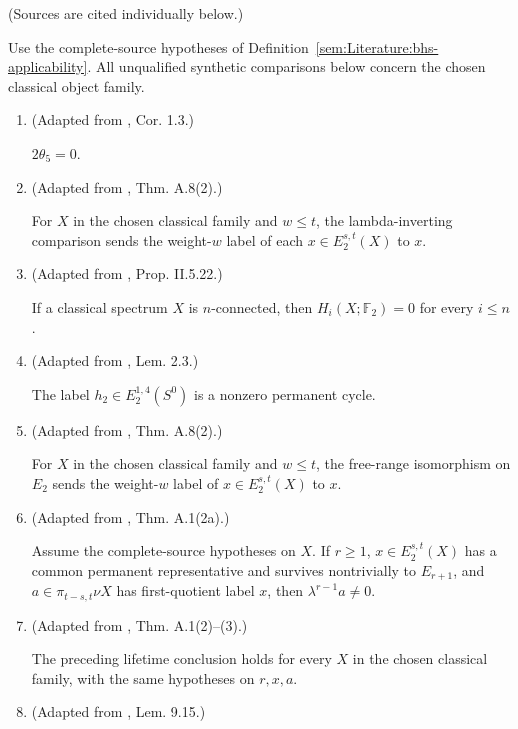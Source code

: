 \begin{theorem}
\label{frontier:Literature:d19d6b7e62ef}
(Sources are cited individually below.)\par{}

Use the complete-source hypotheses of Definition~\ref{sem:Literature:bhs-applicability}. All unqualified synthetic comparisons below concern the chosen classical object family.
\begin{enumerate}
\item (Adapted from \cite{Xu}, Cor. 1.3.)\par{}

$2\theta_5=0$.
\item (Adapted from \cite{BHS}, Thm. A.8(2).)\par{}

For $X$ in the chosen classical family and $w\le t$, the lambda-inverting comparison sends the weight-$w$ label of each $x\in E_2^{s,t}(X)$ to $x$.
\item (Adapted from \cite{SchwedeSymmetricSpectra}, Prop. II.5.22.)\par{}

If a classical spectrum $X$ is $n$-connected, then $H_i(X;\mathbb F_2)=0$ for every $i\le n$.
\item (Adapted from \cite{Adams58}, Lem. 2.3.)\par{}

The label $h_2\in E_2^{1,4}(S^0)$ is a nonzero permanent cycle.
\item (Adapted from \cite{BHS}, Thm. A.8(2).)\par{}

For $X$ in the chosen classical family and $w\le t$, the free-range isomorphism on $E_2$ sends the weight-$w$ label of $x\in E_2^{s,t}(X)$ to $x$.
\item (Adapted from \cite{BHS}, Thm. A.1(2a).)\par{}

Assume the complete-source hypotheses on $X$. If $r\ge1$, $x\in E_2^{s,t}(X)$ has a common permanent representative and survives nontrivially to $E_{r+1}$, and $a\in\pi_{t-s,t}\nu X$ has first-quotient label $x$, then $\lambda^{r-1}a\ne0$.
\item (Adapted from \cite{BHS}, Thm. A.1(2)--(3).)\par{}

The preceding lifetime conclusion holds for every $X$ in the chosen classical family, with the same hypotheses on $r,x,a$.
\item (Adapted from \cite{BHS}, Lem. 9.15.)\par{}


\end{enumerate}
\end{theorem}
